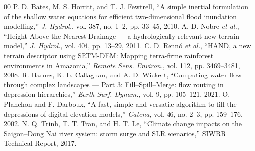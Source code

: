 \documentclass[conference]{IEEEtran}
\begin{document}
\begin{thebibliography}{00}
 P. D. Bates, M. S. Horritt, and T. J. Fewtrell, ``A simple inertial formulation of the shallow water equations for efficient two-dimensional flood inundation modelling,'' \emph{J. Hydrol.}, vol. 387, no. 1--2, pp. 33--45, 2010.
 A. D. Nobre \emph{et al.}, ``Height Above the Nearest Drainage --- a hydrologically relevant new terrain model,'' \emph{J. Hydrol.}, vol. 404, pp. 13--29, 2011.
 C. D. Renn\'o \emph{et al.}, ``HAND, a new terrain descriptor using SRTM-DEM: Mapping terra-firme rainforest environments in Amazonia,'' \emph{Remote Sens. Environ.}, vol. 112, pp. 3469--3481, 2008.
 R. Barnes, K. L. Callaghan, and A. D. Wickert, ``Computing water flow through complex landscapes --- Part 3: Fill--Spill--Merge: flow routing in depression hierarchies,'' \emph{Earth Surf. Dynam.}, vol. 9, pp. 105--121, 2021.
 O. Planchon and F. Darboux, ``A fast, simple and versatile algorithm to fill the depressions of digital elevation models,'' \emph{Catena}, vol. 46, no. 2--3, pp. 159--176, 2002.
 N. Q. Trinh, T. T. Tran, and H. T. Le, ``Climate change impacts on the Saigon--Dong Nai river system: storm surge and SLR scenarios,'' SIWRR Technical Report, 2017. %
\end{thebibliography}
\end{document}
